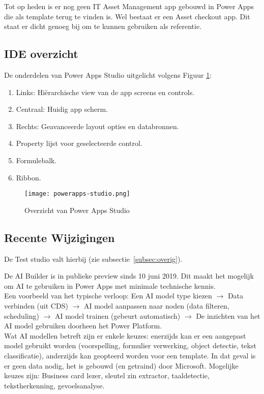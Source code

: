 Tot op heden is er nog geen IT Asset Management app gebouwd in Power Apps die als template terug te vinden is. Wel bestaat er een Asset checkout app. Dit staat er dicht genoeg bij om te kunnen gebruiken als referentie. \autocite{Meganathan2019}

\subsection{IDE overzicht}

De onderdelen van Power Apps Studio uitgelicht volgens Figuur \ref{fig:pastudio}:
\begin{enumerate}
    \item Links: Hiërarchische view van de app screens en controls.
    \item Centraal: Huidig app scherm.
    \item Rechts: Geavanceerde layout opties en databronnen.
    \item Property lijst voor geselecteerde control.
    \item Formulebalk.
    \item Ribbon.
\end{enumerate}

\begin{figure}[h!]
    \texttt{[image: powerapps-studio.png]}
    \caption{Overzicht van Power Apps Studio \autocite{MicrosoftDocs2017}}
    \label{fig:pastudio}
\end{figure}

\subsection{Recente Wijzigingen}
\label{subsec:recente-wijzigingen}

De Test studio valt hierbij (zie subsectie~\ref{subsec:overig}). %

De AI Builder is in publieke preview sinds 10 juni 2019. Dit maakt het mogelijk om AI te gebruiken in Power Apps met minimale technische kennis.\\
Een voorbeeld van het typische verloop: Een AI model type kiezen $\rightarrow$ Data verbinden (uit CDS) $\rightarrow$ AI model aanpassen naar noden (data filteren, scheduling) $\rightarrow$ AI model trainen (gebeurt automatisch) $\rightarrow$ De inzichten van het AI model gebruiken doorheen het Power Platform.\\
Wat AI modellen betreft zijn er enkele keuzes: enerzijds kan er een aangepast model gebruikt worden (voorspelling, formulier verwerking, object detectie, tekst classificatie), anderzijds kan geopteerd worden voor een template. In dat geval is er geen data nodig, het is gebouwd (en getraind) door Microsoft. Mogelijke keuzes zijn: Business card lezer, sleutel zin extractor, taaldetectie, tekstherkenning, gevoelsanalyse. \autocite{MicrosoftDocs2019e}

